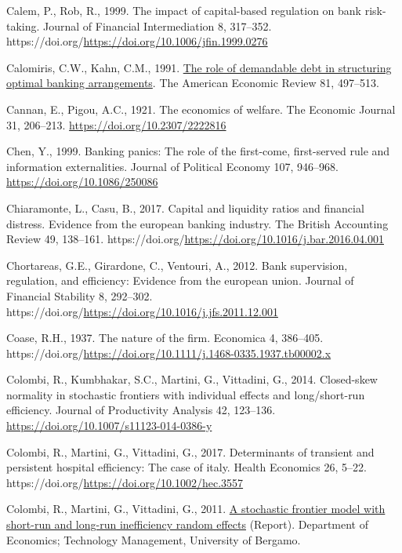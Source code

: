 \documentclass[
  12pt,
  a4paper,
]{scrreprt}
\newlength{\cslhangindent}
\newenvironment{CSLReferences}[2] %
 {\begin{list}{}{%
  \setlength{\itemindent}{0pt}
  \setlength{\leftmargin}{0pt}
  \setlength{\parsep}{0pt}
  \ifodd #1
   \setlength{\leftmargin}{\cslhangindent}
   \setlength{\itemindent}{-1\cslhangindent}
  \fi
  \setlength{\itemsep}{#2\baselineskip}}}
 {\end{list}}
\begin{document}
{{{{\begin{CSLReferences}{1}{0}
Calem, P., Rob, R., 1999. The impact of capital-based regulation on bank
risk-taking. Journal of Financial Intermediation 8, 317--352.
https://doi.org/\url{https://doi.org/10.1006/jfin.1999.0276}

Calomiris, C.W., Kahn, C.M., 1991.
\href{http://www.jstor.org/stable/2006515}{The role of demandable debt
in structuring optimal banking arrangements}. The American Economic
Review 81, 497--513.

Cannan, E., Pigou, A.C., 1921. The economics of welfare. The Economic
Journal 31, 206--213. \url{https://doi.org/10.2307/2222816}

Chen, Y., 1999. Banking panics: The role of the first-come, first-served
rule and information externalities. Journal of Political Economy 107,
946--968. \url{https://doi.org/10.1086/250086}

Chiaramonte, L., Casu, B., 2017. Capital and liquidity ratios and
financial distress. Evidence from the european banking industry. The
British Accounting Review 49, 138--161.
https://doi.org/\url{https://doi.org/10.1016/j.bar.2016.04.001}

Chortareas, G.E., Girardone, C., Ventouri, A., 2012. Bank supervision,
regulation, and efficiency: Evidence from the european union. Journal of
Financial Stability 8, 292--302.
https://doi.org/\url{https://doi.org/10.1016/j.jfs.2011.12.001}

Coase, R.H., 1937. The nature of the firm. Economica 4, 386--405.
https://doi.org/\url{https://doi.org/10.1111/j.1468-0335.1937.tb00002.x}

Colombi, R., Kumbhakar, S.C., Martini, G., Vittadini, G., 2014.
Closed-skew normality in stochastic frontiers with individual effects
and long/short-run efficiency. Journal of Productivity Analysis 42,
123--136. \url{https://doi.org/10.1007/s11123-014-0386-y}

Colombi, R., Martini, G., Vittadini, G., 2017. Determinants of transient
and persistent hospital efficiency: The case of italy. Health Economics
26, 5--22. https://doi.org/\url{https://doi.org/10.1002/hec.3557}

Colombi, R., Martini, G., Vittadini, G., 2011.
\href{https://EconPapers.repec.org/RePEc:brh:wpaper:1101}{A stochastic
frontier model with short-run and long-run inefficiency random effects}
(Report). Department of Economics; Technology Management, University of
Bergamo.


\end{CSLReferences}}}}}
\end{document}

